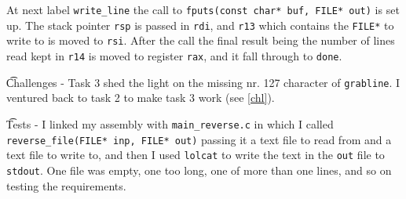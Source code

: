 At next label \texttt{write\_line} the call to \texttt{fputs(const char* buf,
FILE* out)} is set up. The stack pointer \texttt{rsp} is passed in
\texttt{rdi}, and \texttt{r13} which contains the \texttt{FILE*} to write to is
moved to \texttt{rsi}.
After the call the final result being the number of lines read kept in
\texttt{r14} is moved to register \texttt{rax}, and it fall through to
\texttt{done}.






\t{Challenges} -
Task 3 shed the light on the missing nr. 127 character of \texttt{grabline}. I
ventured back to task 2 to make task 3 work (see \ref{chl}).

\t{Tests} - I linked my assembly with \texttt{main\_reverse.c} in which I
called \texttt{reverse\_file(FILE* inp, FILE* out)} passing it a text file to
read from and a text file to write to, and then I used \texttt{lolcat} to write
the text in the \texttt{out} file to \texttt{stdout}.
One file was empty, one too long, one of more than one lines, and so on testing
the requirements.


